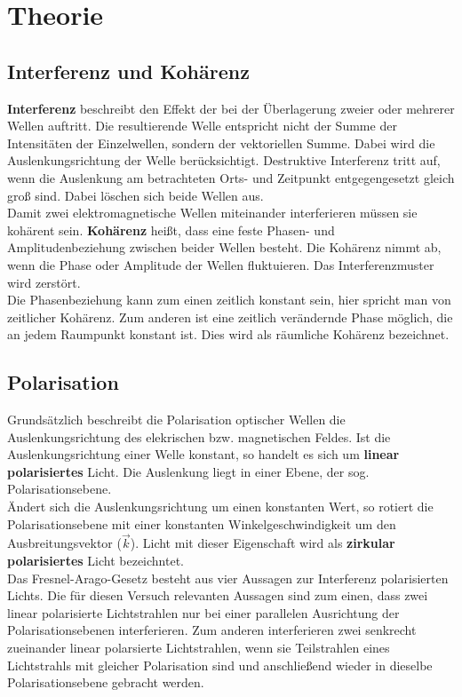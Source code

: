 \section{Theorie}
\label{sec:Theorie}

\subsection{Interferenz und Kohärenz}
\textbf{Interferenz} beschreibt den Effekt der bei der Überlagerung zweier oder mehrerer Wellen auftritt.
Die resultierende Welle entspricht nicht der Summe der Intensitäten der Einzelwellen, sondern der vektoriellen Summe.
Dabei wird die Auslenkungsrichtung der Welle berücksichtigt.
Destruktive Interferenz tritt auf, wenn die Auslenkung am betrachteten Orts- und Zeitpunkt entgegengesetzt gleich groß sind.
Dabei löschen sich beide Wellen aus.
\\
Damit zwei elektromagnetische Wellen miteinander interferieren müssen sie kohärent sein.
\textbf{Kohärenz} heißt, dass eine feste Phasen- und Amplitudenbeziehung zwischen beider Wellen besteht.
Die Kohärenz nimmt ab, wenn die Phase oder Amplitude der Wellen fluktuieren.
Das Interferenzmuster wird zerstört.
\\
Die Phasenbeziehung kann zum einen zeitlich konstant sein, hier spricht man von zeitlicher Kohärenz.
Zum anderen ist eine zeitlich verändernde Phase möglich, die an jedem Raumpunkt konstant ist.
Dies wird als räumliche Kohärenz bezeichnet.

\subsection{Polarisation}
\label{sec:polarisation}

Grundsätzlich beschreibt die Polarisation optischer Wellen die Auslenkungsrichtung des elekrischen bzw. magnetischen Feldes.
Ist die Auslenkungsrichtung einer Welle konstant, so handelt es sich um \textbf{linear polarisiertes} Licht.
Die Auslenkung liegt in einer Ebene, der sog. Polarisationsebene.
\\
Ändert sich die Auslenkungsrichtung um einen konstanten Wert, so rotiert die Polarisationsebene mit einer konstanten Winkelgeschwindigkeit um den Ausbreitungsvektor ($\vec{k}$).
Licht mit dieser Eigenschaft wird als \textbf{zirkular polarisiertes} Licht bezeichntet.
\\
Das Fresnel-Arago-Gesetz\cite{hecht2018optik} besteht aus vier Aussagen zur Interferenz polarisierten Lichts.
Die für diesen Versuch relevanten Aussagen sind zum einen, dass zwei linear polarisierte Lichtstrahlen nur bei einer parallelen Ausrichtung der Polarisationsebenen interferieren.
Zum anderen interferieren zwei senkrecht zueinander linear polarsierte Lichtstrahlen, wenn sie Teilstrahlen eines Lichtstrahls mit gleicher Polarisation sind und anschließend wieder in dieselbe Polarisationsebene gebracht werden.

